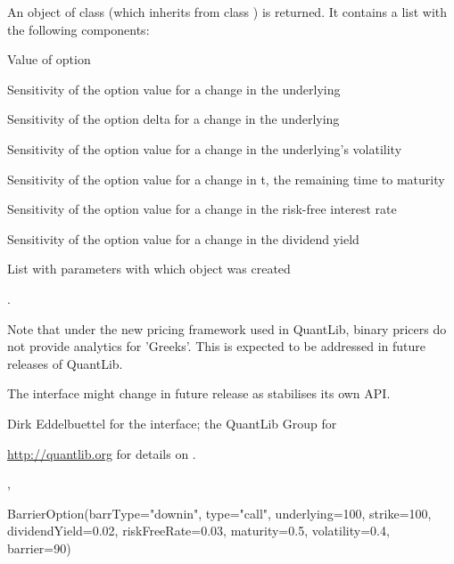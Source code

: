\begin{Value}
An object of class  (which inherits from class
) is returned. It contains a list with the
following components: 
\begin{ldescription}
\item[\code{value}] Value of option
\item[\code{delta}] Sensitivity of the option value for a change in the underlying
\item[\code{gamma}] Sensitivity of the option delta for a change in the underlying
\item[\code{vega}] Sensitivity of the option value for a change in the
underlying's volatility
\item[\code{theta}] Sensitivity of the option value for a change in t, the
remaining time to maturity
\item[\code{rho}] Sensitivity of the option value for a change in the
risk-free interest rate
\item[\code{dividendRho}] Sensitivity of the option value for a change in the
dividend yield
\item[\code{parameters}] List with parameters with which object was created
\end{ldescription}
.

Note that under the new pricing framework used in QuantLib, binary
pricers do not provide analytics for 'Greeks'. This is expected to be
addressed in future releases of QuantLib.
\end{Value}
\begin{Note}\relax
The interface might change in future release as 
stabilises its own API.
\end{Note}
\begin{Author}\relax
Dirk Eddelbuettel  for the \R{} interface;
the QuantLib Group for 
\end{Author}
\begin{References}\relax
\url{http://quantlib.org} for details on .
\end{References}
\begin{SeeAlso}\relax
{},
\end{SeeAlso}
\begin{Examples}
\begin{ExampleCode}
BarrierOption(barrType="downin", type="call", underlying=100,
        strike=100, dividendYield=0.02, riskFreeRate=0.03,
        maturity=0.5, volatility=0.4, barrier=90)
\end{ExampleCode}
\end{Examples}

